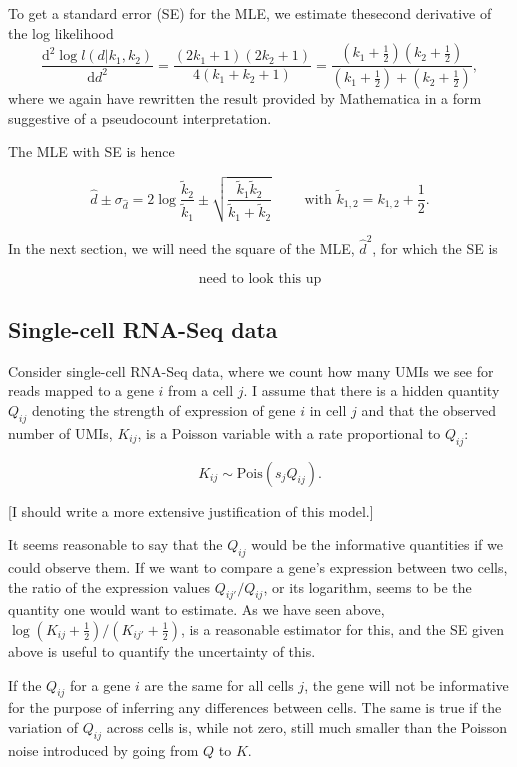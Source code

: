 \documentclass{article}
\begin{document}
To get a standard error (SE) for the MLE, we estimate thesecond derivative of the log likelihood
\[ \frac{\mathrm{d}^2\log l(d|k_1,k_2)}{\mathrm{d}d^2} =  \frac{ ( 2 k_1 + 1 ) ( 2 k_2 + 1 ) }{ 4 (k_1+k_2+1) } = 
\frac{(k_1+\frac{1}{2})(k_2+\frac{1}{2})}{(k_1+\frac{1}{2})+(k_2+\frac{1}{2})},\]
where we again have rewritten the result provided by Mathematica in a form suggestive of a pseudocount interpretation.

The MLE with SE is hence

\[ \hat d \pm \sigma_{\hat d} = 2 \log\frac{\tilde k_2}{ \tilde k_1 }
\pm \sqrt{ \frac{\tilde k_1 \tilde k_2}{\tilde k_1 + \tilde k_2} } \qquad \text{ with } \tilde k_{1,2} = k_{1,2} + \textstyle{\frac{1}{2}}. \]

In the next section, we will need the square of the MLE, $\hat d^ 2$, for which the SE is

\[ \text{need to look this up} \]


\subsection*{Single-cell RNA-Seq data}

Consider single-cell RNA-Seq data, where we count how many UMIs we see for reads mapped to a gene $i$ from a cell $j$. I assume that there is a hidden quantity $Q_{ij}$ denoting the strength of expression of gene $i$ in cell $j$ and that the observed number of UMIs, $K_{ij}$, is a Poisson 
variable with a rate proportional to $Q_{ij}$:

\[ K_{ij} \sim \text{Pois}(s_j Q_{ij}). \]

[I should write a more extensive justification of this model.]

It seems reasonable to say that the $Q_{ij}$ would be the informative quantities if we could observe them. If we want to compare a gene's expression between two cells, the ratio of the expression values $Q_{ij'}/Q_{ij}$, or its logarithm, seems to be the quantity one would want to estimate. As we have seen above, $\log (K_{ij}+\frac{1}{2}) / (K_{ij'}+\frac{1}{2})$, is a reasonable estimator for this, and the SE given above is useful to quantify the uncertainty of this.

If the $Q_{ij}$ for a gene $i$ are the same for all cells $j$, the gene will not be informative for the purpose of inferring any differences between cells. The same is true if the variation of $Q_{ij}$ across cells is, while not zero, still much smaller than the Poisson noise introduced by going
from $Q$ to $K$.
\end{document}
